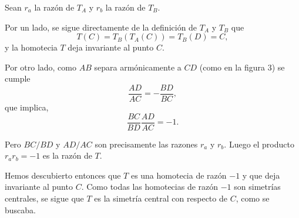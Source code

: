 \begin{sol}
	Sean $r_a$ la razón de $T_A$ y $r_b$ la razón de $T_B$.
	
	Por un lado, se sigue directamente de la definición de $T_A$ y $T_B$ que
	\[ T(C) = T_B(T_A(C)) = T_B(D) = C, \]
	y la homotecia $T$ deja invariante al punto $C$.
	
	Por otro lado, como $AB$ separa armónicamente a $CD$ (como en la figura 3) se cumple
	\[ \frac{AD}{AC} = -\frac{BD}{BC}, \]
	que implica,
	\[ \frac{BC}{BD}\frac{AD}{AC} = -1. \]
	
	Pero $BC/BD$ y $AD/AC$ son precisamente las razones $r_a$ y $r_b$. Luego el producto $r_ar_b = -1$ es la razón de $T$.
	
	Hemos descubierto entonces que $T$ es una homotecia de razón $-1$ y que deja invariante al punto $C$. Como todas las homotecias de razón $-1$ son simetrías centrales, se sigue que $T$ es la simetría central con respecto de $C$, como se buscaba.
\end{sol}
